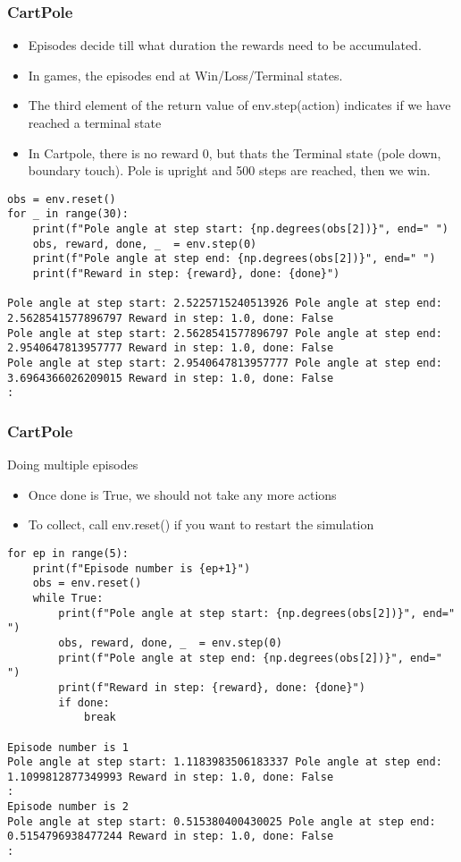 \begin{frame}[fragile]\frametitle{CartPole}

\begin{itemize}
\item Episodes decide till what duration the rewards need to be accumulated.
\item In games, the episodes end at Win/Loss/Terminal states.
\item The third element of the return value of env.step(action) indicates if we have reached a terminal state
\item In Cartpole, there is no reward 0, but thats the Terminal state (pole down, boundary touch). Pole is upright and 500 steps are reached, then we win.
\end{itemize}

\begin{lstlisting}
obs = env.reset()
for _ in range(30):
    print(f"Pole angle at step start: {np.degrees(obs[2])}", end=" ")
    obs, reward, done, _  = env.step(0)
    print(f"Pole angle at step end: {np.degrees(obs[2])}", end=" ")
    print(f"Reward in step: {reward}, done: {done}")
		
Pole angle at step start: 2.5225715240513926 Pole angle at step end: 2.5628541577896797 Reward in step: 1.0, done: False
Pole angle at step start: 2.5628541577896797 Pole angle at step end: 2.9540647813957777 Reward in step: 1.0, done: False
Pole angle at step start: 2.9540647813957777 Pole angle at step end: 3.6964366026209015 Reward in step: 1.0, done: False
:		
\end{lstlisting}


\end{frame}

\begin{frame}[fragile]\frametitle{CartPole}

Doing multiple episodes
\begin{itemize}
\item Once done is True, we should not take any more actions
\item To collect, call env.reset() if you want to restart the simulation
\end{itemize}

\begin{lstlisting}
for ep in range(5):
    print(f"Episode number is {ep+1}")
    obs = env.reset()
    while True:
        print(f"Pole angle at step start: {np.degrees(obs[2])}", end=" ")
        obs, reward, done, _  = env.step(0)
        print(f"Pole angle at step end: {np.degrees(obs[2])}", end=" ")
        print(f"Reward in step: {reward}, done: {done}")
        if done:
            break
						
Episode number is 1
Pole angle at step start: 1.1183983506183337 Pole angle at step end: 1.1099812877349993 Reward in step: 1.0, done: False
:
Episode number is 2
Pole angle at step start: 0.515380400430025 Pole angle at step end: 0.5154796938477244 Reward in step: 1.0, done: False
:
\end{lstlisting}

\end{frame}